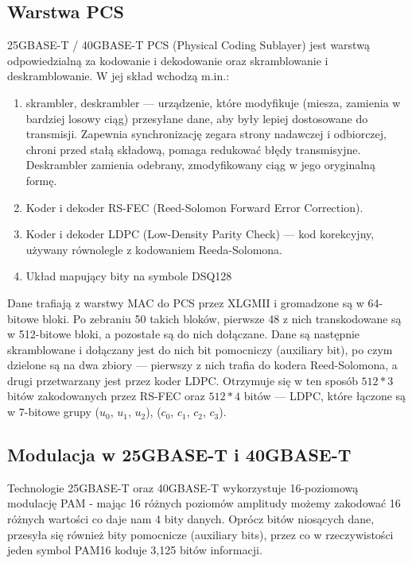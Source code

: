 \subsection{Warstwa PCS}\label{subsection:pcs}
25GBASE-T / 40GBASE-T PCS (Physical Coding Sublayer) jest warstwą odpowiedzialną za kodowanie i dekodowanie oraz skramblowanie i deskramblowanie.
W jej skład wchodzą m.in.:
\begin{enumerate}
    \item skrambler, deskrambler --- urządzenie, które modyfikuje (miesza, zamienia w bardziej losowy ciąg) przesyłane dane,
        aby były lepiej dostosowane do transmisji. Zapewnia synchronizację zegara strony nadawczej i odbiorczej, chroni przed stałą składową,
        pomaga redukować błędy transmisyjne. Deskrambler zamienia odebrany, zmodyfikowany ciąg w jego oryginalną formę.
    \item Koder i dekoder RS-FEC (Reed-Solomon Forward Error Correction).
    \item Koder i dekoder LDPC (Low-Density Parity Check) --- kod korekcyjny, używany równolegle z kodowaniem Reeda-Solomona.
    \item Układ mapujący bity na symbole DSQ128
\end{enumerate}

Dane trafiają z warstwy MAC do PCS przez XLGMII i gromadzone są w 64-bitowe bloki. Po zebraniu 50 takich bloków, pierwsze 48 z nich transkodowane są w 512-bitowe bloki, a pozostałe są do nich dołączane. Dane są następnie skramblowane i dołączany jest do nich bit pomocniczy (auxiliary bit), po czym dzielone są na dwa zbiory --- pierwszy z nich trafia do kodera Reed-Solomona, a drugi przetwarzany jest przez koder LDPC. Otrzymuje się w ten sposób $512*3$ bitów zakodowanych przez RS-FEC oraz $512*4$ bitów --- LDPC, które łączone są w 7-bitowe grupy  ($u_0$, $u_1$, $u_2$), ($c_0$, $c_1$, $c_2$, $c_3$).

\subsection{Modulacja w 25GBASE-T i 40GBASE-T}

Technologie 25GBASE-T oraz 40GBASE-T wykorzystuje 16-poziomową modulację PAM - mając 16 różnych poziomów amplitudy możemy zakodować 16 różnych wartości co daje nam 4 bity danych.
Oprócz bitów niosących dane, przesyła się również bity pomocnicze (auxiliary bits), przez co w rzeczywistości jeden symbol PAM16 koduje 3,125 bitów informacji.

